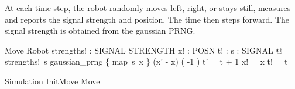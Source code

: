 \documentclass{article}
\begin{document}
At each time step, the robot randomly moves left, right, or stays still, measures and reports the
signal strength and position.  The time then steps forward.  The signal strength is obtained from
the gaussian PRNG.

\begin{schema}{Move}
  \Delta Robot \also
  strengths! : SIGNAL \fun STRENGTH \also
  x! : POSN \also
  t! : \nat
  \where
  \forall s : SIGNAL @ strengths!~s \in gaussian\_prng \limg \{ map~s~x \} \rimg \also
  (x' - x) \in ( -1  ) \also
  t' = t + 1 \also
  x! = x \also
  t! = t
\end{schema}

\begin{zed}
  Simulation  InitMove \semi Move
\end{zed}
\end{document}
